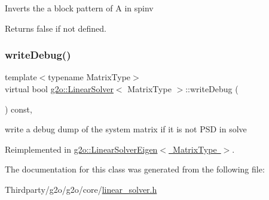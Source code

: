 Inverts the a block pattern of A in spinv \begin{DoxyReturn}{Returns}
false if not defined. 
\end{DoxyReturn}
\mbox{\label{classg2o_1_1_linear_solver_ac4b23c56cf69759a692906fc8816cf8f}} 
\subsubsection{\texorpdfstring{write\+Debug()}{writeDebug()}}
{\footnotesize\ttfamily template$<$typename Matrix\+Type$>$ \\
virtual bool \mbox{\hyperlink{classg2o_1_1_linear_solver}{g2o\+::\+Linear\+Solver}}$<$ Matrix\+Type $>$\+::write\+Debug (\begin{DoxyParamCaption}{ }\end{DoxyParamCaption}) const\hspace{0.3cm}{\ttfamily [inline]}, {\ttfamily [virtual]}}



write a debug dump of the system matrix if it is not P\+SD in solve 



Reimplemented in \mbox{\hyperlink{classg2o_1_1_linear_solver_eigen_ad9bccc1b4bcd3cc5e107ac09ac93cf4b}{g2o\+::\+Linear\+Solver\+Eigen$<$ Matrix\+Type $>$}}.



The documentation for this class was generated from the following file\+:\begin{DoxyCompactItemize}
\item 
Thirdparty/g2o/g2o/core/\mbox{\hyperlink{linear__solver_8h}{linear\+\_\+solver.\+h}}\end{DoxyCompactItemize}
